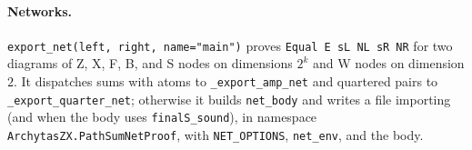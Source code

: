 \paragraph{Networks.} \textnormal{\texttt{export\_\allowbreak{}net(\allowbreak{}left,\allowbreak{} right,\allowbreak{} name="main")}} proves \textnormal{\texttt{Equal E sL NL sR NR}}
for two diagrams of Z, X, F, B, and S nodes on dimensions $2^k$ and W nodes on dimension $2$.
It dispatches sums with atoms to \textnormal{\texttt{\_\allowbreak{}export\_\allowbreak{}amp\_\allowbreak{}net}} and quartered pairs to
\textnormal{\texttt{\_\allowbreak{}export\_\allowbreak{}quarter\_\allowbreak{}net}}; otherwise it builds \textnormal{\texttt{net\_\allowbreak{}body}} and writes a file importing
 (and  when the body uses
\textnormal{\texttt{finalS\_\allowbreak{}sound}}), in namespace \textnormal{\texttt{ArchytasZX.\allowbreak{}PathSumNetProof}}, with \textnormal{\texttt{NET\_\allowbreak{}OPTIONS}},
\textnormal{\texttt{net\_\allowbreak{}env}}, and the body.

